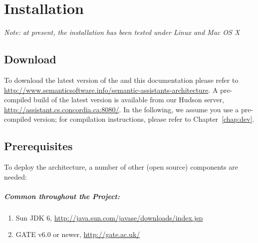 

   
 

\chapter{Installation}
\label{chap:inst}
\emph{Note: at present, the installation has been tested under
  Linux and Mac OS X}

\section{Download}
To download the latest version of the \sa and this documentation
please refer to
\url{http://www.semanticsoftware.info/semantic-assistants-architecture}.
A pre-compiled build of the latest version is available from our
Hudson server, \url{http://assistant.cs.concordia.ca:8080/}. In the
following, we assume you use a pre-compiled version; for compilation
instructions, please refer to Chapter~\ref{chap:dev}.

\section{Prerequisites}
To deploy the \sa architecture, a number of other (open source)
components are needed:

\paragraph{Common throughout the Project:}
\begin{enumerate}
  \item  Sun JDK 6, \url{http://java.sun.com/javase/downloads/index.jsp}
  \item  GATE v6.0 or newer, \url{http://gate.ac.uk/}
\end{enumerate} 

